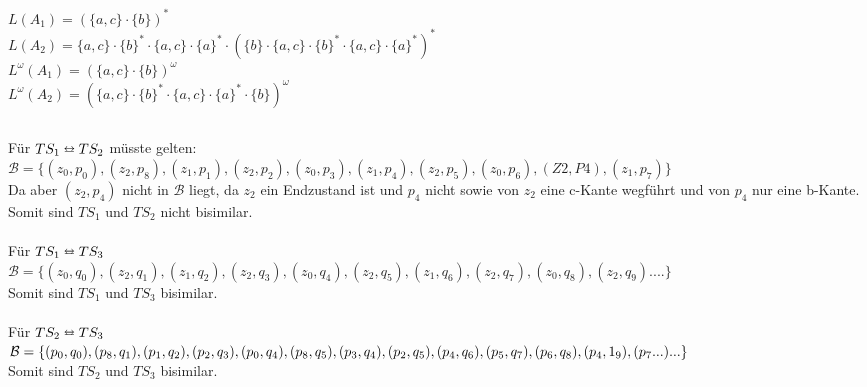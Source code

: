 \documentclass[a4paper,12pt]{scrartcl}
\title{\blatt}
\date{Gruppe 06}
\author{Sabrina Buczko 6663234, Julian Deinert 6535880, Rafael Heid 6704828}
\begin{document}
\maketitle
\newpage
\setcounter{section}{2}
\section{}
\setcounter{subsection}{2}
\subsection{}
\subsubsection{}
$L(A_1)=(\{a,c\}\cdot\{b\})^*$\\
$L(A_2)=\{a,c\}\cdot\{b\}^* \cdot \{a,c\}\cdot \{a\}^* \cdot(\{b\}\cdot \{a,c\}\cdot\{b\}^* \cdot \{a,c\}\cdot \{a\}^*)^*$\\
$L^\omega (A_1)=(\{a,c\}\cdot\{b\})^\omega$\\
$L^\omega (A_2)=(\{a,c\}\cdot\{b\}^* \cdot \{a,c\}\cdot \{a\}^* \cdot\{b\})^\omega$

\subsubsection{}

\subsubsection{}

\subsection{}
\subsubsection{}
Für $TS_1 \leftrightarroweq TS_2$ müsste gelten:\\
$\mathcal{B} = \{(z_0,p_0),(z_2,p_8),(z_1,p_1),(z_2,p_2),(z_0,p_3),(z_1,p_4),(z_2,p_5),(z_0,p_6),(Z2,P4),(z_1,p_7)\}$\\
Da aber $(z_2,p_4)$ nicht in $\mathcal{B}$ liegt, da $z_2$ ein Endzustand ist und $p_4$ nicht sowie von $z_2$ eine c-Kante wegführt und von $p_4$ nur eine b-Kante. Somit sind $TS_1$ und $TS_2$ nicht bisimilar.\\\\
Für $TS_1 \leftrightarroweq TS_3$\\
$\mathcal{B} = \{(z_0,q_0),(z_2,q_1),(z_1,q_2),(z_2,q_3),(z_0,q_4),(z_2,q_5),(z_1,q_6),(z_2,q_7),(z_0,q_8),(z_2,q_9)....\}$\\
Somit sind $TS_1$ und $TS_3$ bisimilar.\\\\
Für $TS_2 \leftrightarroweq TS_3$\\
$\mathcal{B} = \{(p_0,q_0),(p_8,q_1),(p_1,q_2),(p_2,q_3),(p_0,q_4),(p_8,q_5),(p_3,q_4),(p_2,q_5),(p_4,q_6)\\,(p_5,q_7),(p_6,q_8),(p_4,1_9),(p_7...)...\}$\\
Somit sind $TS_2$ und $TS_3$ bisimilar.\\\\
\end{document}
